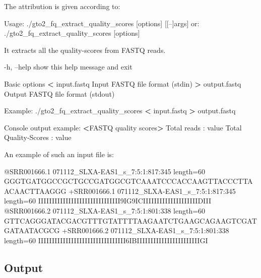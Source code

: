 \documentclass[11pt,]{krantz}
\newenvironment{Shaded}{\begin{snugshade}}{\end{snugshade}}
\newcommand{\OperatorTok}[1]{\textcolor[rgb]{0.43,0.43,0.43}{\textbf{#1}}}
\newcommand{\ExtensionTok}[1]{#1}
\newcommand{\NormalTok}[1]{#1}
\begin{document}
The attribution is given according to:

\begin{Shaded}
\begin{Highlighting}[]
\ExtensionTok{Usage}\NormalTok{: ./gto2_fq_extract_quality_scores [options] [[--]args]}
   \ExtensionTok{or}\NormalTok{: ./gto2_fq_extract_quality_scores [options]}

\ExtensionTok{It}\NormalTok{ extracts all the quality-scores from FASTQ reads.}

    \ExtensionTok{-h}\NormalTok{, --help            show this help message and exit}

\ExtensionTok{Basic}\NormalTok{ options}
    \OperatorTok{<} \ExtensionTok{input.fastq}\NormalTok{         Input FASTQ file format (stdin)}
    \OperatorTok{>} \ExtensionTok{output.fastq}\NormalTok{        Output FASTQ file format (stdout)}

\ExtensionTok{Example}\NormalTok{: ./gto2_fq_extract_quality_scores }\OperatorTok{<}\NormalTok{ input.fastq }\OperatorTok{>}
\ExtensionTok{output.fastq}

\ExtensionTok{Console}\NormalTok{ output example:}
\OperatorTok{<}\ExtensionTok{FASTQ}\NormalTok{ quality scores}\OperatorTok{>}
\ExtensionTok{Total}\NormalTok{ reads          : value}
\ExtensionTok{Total}\NormalTok{ Quality-Scores : value}
\end{Highlighting}
\end{Shaded}

An example of such an input file is:

\begin{Shaded}
\begin{Highlighting}[]
\ExtensionTok{@SRR001666.1}\NormalTok{ 071112_SLXA-EAS1_s_7:5:1:817:345 length=60}
\ExtensionTok{GGGTGATGGCCGCTGCCGATGGCGTCAAATCCCACCAAGTTACCCTTAACAACTTAAGGG}
\ExtensionTok{+SRR001666.1}\NormalTok{ 071112_SLXA-EAS1_s_7:5:1:817:345 length=60}
\ExtensionTok{IIIIIIIIIIIIIIIIIIIIIIIIIIIIII9IG9ICIIIIIIIIIIIIIIIIIIIIDIII}
\ExtensionTok{@SRR001666.2}\NormalTok{ 071112_SLXA-EAS1_s_7:5:1:801:338 length=60}
\ExtensionTok{GTTCAGGGATACGACGTTTGTATTTTAAGAATCTGAAGCAGAAGTCGATGATAATACGCG}
\ExtensionTok{+SRR001666.2}\NormalTok{ 071112_SLXA-EAS1_s_7:5:1:801:338 length=60}
\ExtensionTok{IIIIIIIIIIIIIIIIIIIIIIIIIIIIIIII6IBIIIIIIIIIIIIIIIIIIIIIIIGI}
\end{Highlighting}
\end{Shaded}

\subsection*{Output}\label{output-3}
\end{document}
